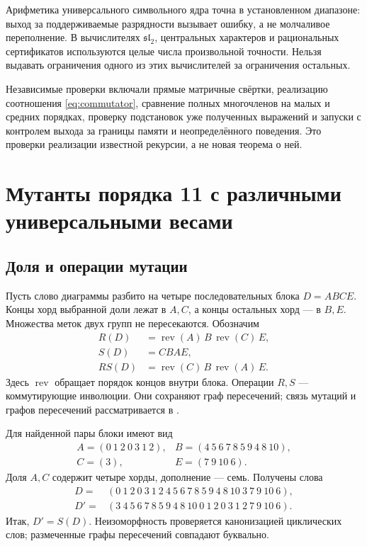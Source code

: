 \documentclass[11pt,a4paper]{article}
\numberwithin{equation}{section}
\theoremstyle{definition}
\theoremstyle{remark}
\newcommand{\sll}{\mathfrak{sl}}
\newcommand{\rev}{\operatorname{rev}}
\begin{document}
Арифметика универсального символьного ядра точна в установленном диапазоне:
выход за поддерживаемые разрядности вызывает ошибку, а не молчаливое
переполнение. В вычислителях $\sll_2$, центральных характеров и рациональных
сертификатов используются целые числа произвольной точности. Нельзя
выдавать ограничения одного из этих вычислителей за ограничения остальных.

Независимые проверки включали прямые матричные свёртки, реализацию
соотношения \eqref{eq:commutator}, сравнение полных многочленов на малых
и средних порядках, проверку подстановок уже полученных выражений и
запуски с контролем выхода за границы памяти и неопределённого поведения.
Это проверки реализации известной рекурсии, а не новая теорема о ней.


\section{Мутанты порядка 11 с различными универсальными весами}
\label{sec:mutants11}

\subsection{Доля и операции мутации}

Пусть слово диаграммы разбито на четыре последовательных блока
$D=ABCE$. Концы хорд выбранной доли лежат в $A,C$, а концы остальных
хорд --- в $B,E$. Множества меток двух групп не пересекаются.
Обозначим
\begin{equation}\label{eq:mutations}
 \begin{split}
 R(D)&=\rev(A)\,B\,\rev(C)\,E,\\
 S(D)&=CBAE,\\
 RS(D)&=\rev(C)\,B\,\rev(A)\,E.
 \end{split}
\end{equation}
Здесь $\rev$ обращает порядок концов внутри блока. Операции $R,S$ ---
коммутирующие инволюции. Они сохраняют граф пересечений; связь мутаций
и графов пересечений рассматривается в \cite{chmutovlando}.

Для найденной пары блоки имеют вид
\[
 \begin{array}{ll}
 A=(0\ 1\ 2\ 0\ 3\ 1\ 2),&B=(4\ 5\ 6\ 7\ 8\ 5\ 9\ 4\ 8\ 10),\\
 C=(3),&E=(7\ 9\ 10\ 6).
 \end{array}
\]
Доля $A,C$ содержит четыре хорды, дополнение --- семь. Получены слова
\begin{equation}\label{eq:words11}
\begin{aligned}
D={}&(0\ 1\ 2\ 0\ 3\ 1\ 2\ 4\ 5\ 6\ 7\ 8\ 5\ 9\ 4\ 8\ 10\ 3\ 7\ 9\ 10\ 6),\\
D'={}&(3\ 4\ 5\ 6\ 7\ 8\ 5\ 9\ 4\ 8\ 10\ 0\ 1\ 2\ 0\ 3\ 1\ 2\ 7\ 9\ 10\ 6).
\end{aligned}
\end{equation}
Итак, $D'=S(D)$. Неизоморфность проверяется канонизацией циклических
слов; размеченные графы пересечений совпадают буквально.
\end{document}
